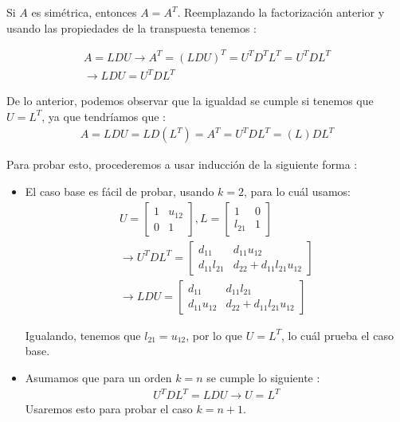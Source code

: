 \documentclass{article}
\begin{document}
\begin{enumerate}
\begin{itemize}
Si $A$ es sim\'etrica, entonces $A=A^{T}$. Reemplazando la factorizaci\'on anterior y usando las propiedades de la transpuesta tenemos :

\begin{gather*}
A = LDU \rightarrow A^{T} = (LDU)^{T} = U^{T}D^{T}L^{T} = U^{T}DL^{T} \\
\rightarrow LDU = U^{T}DL^{T}
\end{gather*}

De lo anterior, podemos observar que la igualdad se cumple si tenemos que $U=L^{T}$, ya que tendr\'iamos que :
\begin{gather*}
A = LDU = LD(L^{T}) = A^{T} = U^{T}DL^{T} = (L)DL^{T}
\end{gather*}

Para probar esto, procederemos a usar inducci\'on de la siguiente forma :

\begin{itemize}
\item El caso base es f\'acil de probar, usando $k = 2$, para lo cu\'al usamos: 
\begin{gather*}
U = 
\begin{bmatrix}
	1  & u_{12} \\
	0  &   1
\end{bmatrix}, 
L = 
\begin{bmatrix}
	   1    &   0    \\
	l_{21}  &   1
\end{bmatrix}\\
\rightarrow
U^{T}DL^{T} = 
\begin{bmatrix}
	   d_{11}     &   d_{11}u_{12}    \\
	d_{11}l_{21}  &   d_{22} + d_{11}l_{21}u_{12}
\end{bmatrix}\\
\rightarrow
LDU = 
\begin{bmatrix}
	   d_{11}     &   d_{11}l_{21}    \\
	d_{11}u_{12}  &   d_{22} + d_{11}l_{21}u_{12}
\end{bmatrix}
\end{gather*}

Igualando, tenemos que $l_{21} = u_{12}$, por lo que $U = L^{T}$, lo cu\'al prueba el caso base.\\

\item Asumamos que para un orden $k = n$ se cumple lo siguiente :
\begin{gather*}
U^{T}DL^{T} = LDU \rightarrow U = L^{T}
\end{gather*}
Usaremos esto para probar el caso $k = n+1$.\\


\end{itemize}
\end{itemize}
\end{enumerate}
\end{document}
